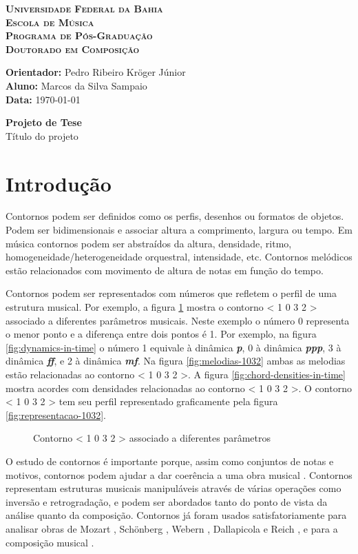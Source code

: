 \documentclass[12pt]{article}
\newcommand{\cabecalho}[0]{
  \textbf{\textsc{Universidade Federal da Bahia}} \\
  \textbf{\textsc{Escola de Música}} \\
  \textbf{\textsc{Programa de Pós-Graduação}} \\
  \textbf{\textsc{Doutorado em Composição}} \par
  \vspace*{1ex}
  \textbf{Orientador:} Pedro Ribeiro Kröger Júnior\\
  \textbf{Aluno: } Marcos da Silva Sampaio \\
  \textbf{Data: } \today
  \thispagestyle{empty}
}
\newcommand{\titulo}[1]{
  \vspace{1cm}
  \begin{center}{
      \Huge \textbf{Projeto de Tese} \\
    }
    \vspace{12pt}
    {\Large #1}
  \end{center}
  \vspace{1cm}
}
\begin{document}
\cabecalho
\titulo{Título do projeto}


\section{Introdução}
\label{sec:introducao}

Contornos podem ser definidos como os perfis, desenhos ou formatos de
objetos. Podem ser bidimensionais e associar altura a comprimento,
largura ou tempo. Em música contornos podem ser abstraídos da altura,
densidade, ritmo, homogeneidade/heterogeneidade orquestral,
intensidade, etc. Contornos melódicos estão relacionados com movimento
de altura de notas em função do tempo.

Contornos podem ser representados com números que refletem o perfil de
uma estrutura musical. Por exemplo, a figura \ref{fig:representacoes}
mostra o contorno < 1 0 3 2 > associado a diferentes parâmetros
musicais. Neste exemplo o número 0 representa o menor ponto e a
diferença entre dois pontos é 1. Por exemplo, na figura
\ref{fig:dynamics-in-time} o número 1 equivale à dinâmica
\textbf{\textit{p}}, 0 à dinâmica \textbf{\textit{ppp}}, 3 à dinâmica
\textbf{\textit{ff}}, e 2 à dinâmica \textbf{\textit{mf}}. Na figura
\ref{fig:melodias-1032} ambas as melodias estão relacionadas ao
contorno < 1 0 3 2 >. A figura \ref{fig:chord-densities-in-time} mostra
acordes com densidades relacionadas ao contorno < 1 0 3 2 >. O contorno
< 1 0 3 2 > tem seu perfil representado graficamente pela figura
\ref{fig:representacao-1032}.

\begin{figure}[h]
  \centering
  \quad

  \subfloat[Altura]{
    \texttt{[image: ly-1032]}
    \label{fig:melodias-1032}
  }
  \caption{Contorno < 1 0 3 2 > associado a diferentes parâmetros}
  \label{fig:representacoes}
\end{figure}

O estudo de contornos é importante porque, assim como conjuntos de
notas e motivos, contornos podem ajudar a dar coerência a uma obra
musical \cite{clifford95:contour}. Contornos representam estruturas
musicais manipuláveis através de várias operações como inversão e
retrogradação, e podem ser abordados tanto do ponto de vista da
análise quanto da composição. Contornos já foram usados
satisfatoriamente para analisar obras de Mozart
\cite{beard03:contour}, Schönberg \cite{friedmann85:methodology},
Webern \cite{clifford95:contour,sampaio08:analise}, Dallapicola
\cite{marvin88:generalized} e Reich \cite{quinn97:fuzzy}, e para a
composição musical \cite{sampaio08:em}.
\end{document}
